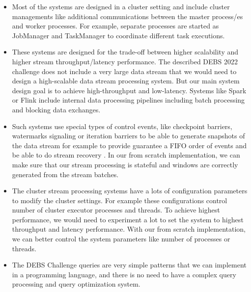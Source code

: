 \begin{itemize}
    \item Most of the systems are designed in a cluster setting and include cluster managements like additional communications between the master process/es and worker processes.
    For example, separate processes are started as JobManager and TaskManager to coordinate different task executions. 

    \item These systems are designed for the trade-off between higher scalability and higher stream throughput/latency performance. 
    The described DEBS 2022 challenge does not include a very large  data stream that we would need to design a high-scalable data stream processing system. But our main system design goal is to achieve 
    high-throughput and low-latency. Systems like Spark or Flink include internal data processing pipelines including batch processing and blocking data exchanges. 
    
    \item Such systems use special types of control events, like  checkpoint barriers,  watermarks signaling or iteration barriers to be able to generate snapshots of 
    the data stream for example to provide guarantee a FIFO order of events and be able to do stream recovery \cite{df177547a4364bb0a7e2470b83025bb0}. 
    In our from scratch implementation, we can make sure that our stream processing is stateful and windows are correctly generated from the stream batches.

    \item The cluster stream processing systems have a lots of configuration parameters to modify the cluster settings. 
    For example these configurations control number of cluster executor processes and threads. To achieve highest performance, we would need 
    to experiment a lot to set the system to highest throughput and latency performance. 
    With our from scratch implementation, we can better control the system parameters like number of processes or threads. 

    \item The DEBS Challenge queries are very simple patterns that we can implement in a programming language, and there is no need to have a complex query processing and query optimization system. 

\end{itemize}



